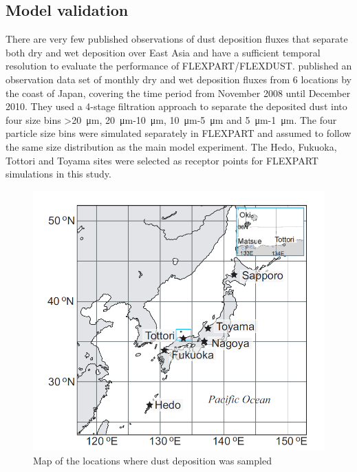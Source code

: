 \subsection{Model validation}\label{sec:model_eval_discription}
There are very few published observations of dust deposition fluxes that separate both dry and wet deposition over East Asia and have a sufficient temporal resolution to evaluate the performance of FLEXPART/FLEXDUST. \textcite{osada2014wet} published an observation data set of monthly dry and wet deposition fluxes from 6 locations by the coast of Japan, covering the time period from November 2008 until December 2010. They used a 4-stage filtration approach to separate the deposited dust into four size bins  >\SI{20}{\micro\metre}, \SI{20}{\micro\metre}-\SI{10}{\micro\metre}, \SI{10}{\micro\metre}-\SI{5}{\micro\metre} and \SI{5}{\micro\metre}-\SI{1}{\micro\metre}. 
The four particle size bins were simulated separately in FLEXPART and assumed to follow the same size distribution as the main model experiment. The Hedo, Fukuoka, Tottori and Toyama sites were selected as receptor points for FLEXPART simulations in this study. 

\begin{figure}[htpb]
    \centering
    \includegraphics[scale=0.45]{texfiles/figs/Osada_locations.PNG}
    \caption{Map of the locations where dust deposition was sampled \parencite{osada2014wet}}
    \label{fig:map_japan}
\end{figure}


